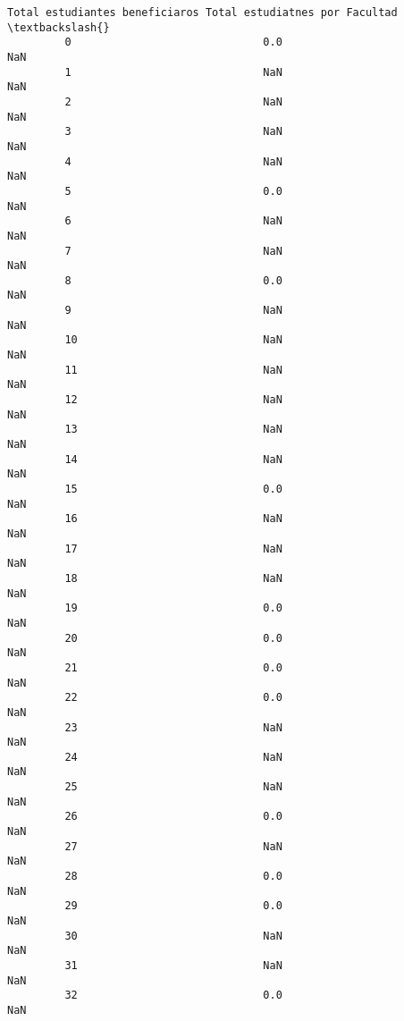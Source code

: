 \documentclass[11pt]{article}
\begin{document}
\begin{Verbatim}[commandchars=\\\{\}]
             Total estudiantes beneficiaros Total estudiatnes por Facultad  \textbackslash{}
         0                              0.0                            NaN   
         1                              NaN                            NaN   
         2                              NaN                            NaN   
         3                              NaN                            NaN   
         4                              NaN                            NaN   
         5                              0.0                            NaN   
         6                              NaN                            NaN   
         7                              NaN                            NaN   
         8                              0.0                            NaN   
         9                              NaN                            NaN   
         10                             NaN                            NaN   
         11                             NaN                            NaN   
         12                             NaN                            NaN   
         13                             NaN                            NaN   
         14                             NaN                            NaN   
         15                             0.0                            NaN   
         16                             NaN                            NaN   
         17                             NaN                            NaN   
         18                             NaN                            NaN   
         19                             0.0                            NaN   
         20                             0.0                            NaN   
         21                             0.0                            NaN   
         22                             0.0                            NaN   
         23                             NaN                            NaN   
         24                             NaN                            NaN   
         25                             NaN                            NaN   
         26                             0.0                            NaN   
         27                             NaN                            NaN   
         28                             0.0                            NaN   
         29                             0.0                            NaN   
         30                             NaN                            NaN   
         31                             NaN                            NaN   
         32                             0.0                            NaN   

\end{Verbatim}
\end{document}

